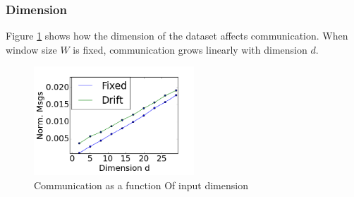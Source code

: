 \documentclass[11pt,twocolumn,varwidth=true,a4paper,fleqn]{article}
\begin{document}
\subsubsection{Dimension}
Figure \ref{Dimension} shows how the dimension of the dataset affects
communication.
When window size $W$ is fixed, communication grows linearly with dimension $d$.
	\begin{figure}[h]
	\centering
	\includegraphics[width=60mm]{CommunicationOfFixedVsDrift/Dimension.png}
	\caption{Communication as a function Of input dimension}
	\label{Dimension}
	\end{figure}
\end{document}
